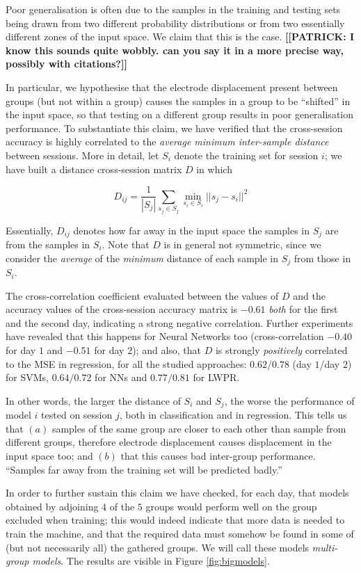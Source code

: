 Poor generalisation is often due to the samples in the training and
testing sets being drawn from two different probability distributions
or from two essentially different zones of the input space. We claim
that this is the case. \textbf{[[PATRICK: I know this sounds quite
wobbly. can you say it in a more precise way, possibly with
citations?]]}

In particular, we hypothesise that the electrode displacement present
between groups (but not within a group) causes the samples in a group
to be ``shifted'' in the input space, so that testing on a different
group results in poor generalisation performance. To substantiate this
claim, we have verified that the cross-session accuracy is highly
correlated to the \emph{average minimum inter-sample distance} between
sessions. More in detail, let $S_i$ denote the training set for
session $i$; we have built a distance cross-session matrix $D$ in
which

$$ D_{ij} = \frac{1}{|S_j|} \sum_{s_j \in S_j}{\min_{s_i \in S_i}{ ||s_j-s_i||^2 } } $$

Essentially, $D_{ij}$ denotes how far away in the input space the
samples in $S_j$ are from the samples in $S_i$. Note that $D$ is in
general not symmetric, since we consider the \emph{average} of the
\emph{minimum} distance of each sample in $S_j$ from those in $S_i$.

The cross-correlation coefficient evaluated between the values of $D$
and the accuracy values of the cross-session accuracy matrix is
$-0.61$ \emph{both} for the first and the second day, indicating a
strong negative correlation. Further experiments have revealed that
this happens for Neural Networks too (cross-correlation $-0.40$ for
day $1$ and $-0.51$ for day $2$); and also, that $D$ is strongly
\emph{positively} correlated to the MSE in regression, for all the
studied approaches: $0.62/0.78$ (day $1$/day $2$) for SVMs,
$0.64/0.72$ for NNs and $0.77/0.81$ for LWPR.

In other words, the larger the distance of $S_i$ and $S_j$, the worse
the performance of model $i$ tested on session $j$, both in
classification and in regression. This tells us that $(a)$ samples of
the same group are closer to each other than sample from different
groups, therefore electrode displacement causes displacement in the
input space too; and $(b)$ that this causes bad inter-group
performance. ``Samples far away from the training set will be
predicted badly.''

In order to further sustain this claim we have checked, for each day,
that models obtained by adjoining $4$ of the $5$ groups would perform
well on the group excluded when training; this would indeed indicate
that more data is needed to train the machine, and that the required
data must somehow be found in some of (but not necessarily all) the
gathered groups. We will call these models \emph{multi-group
models}. The results are visible in Figure \ref{fig:bigmodels}.

